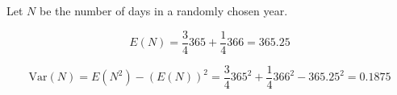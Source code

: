 Let $N$ be the number of days in a randomly chosen year.

$$E(N) = \frac{3}{4}365 + \frac{1}{4}366 = 365.25$$

$$\text{Var}(N) = E(N^{2}) - (E(N))^{2} = \frac{3}{4}365^{2} + \frac{1}{4}366^
{2} - 365.25^{2} = 0.1875$$